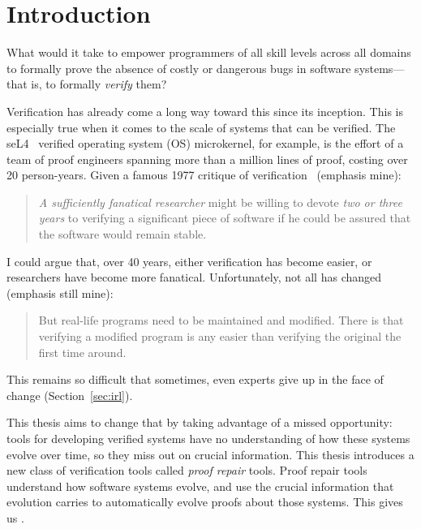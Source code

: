 \chapter{Introduction}



What would it take to empower programmers of all skill levels across all domains to formally prove
the absence of costly or dangerous bugs in software systems---that is, to formally \textit{verify} them?

Verification has already come a long way toward this since its inception.
This is especially true when it comes to the scale of systems that can be verified.
The seL4~\cite{Klein2009} verified operating system (OS) microkernel, for example,
is the effort of a team of proof engineers spanning more than
a million lines of proof, costing over 20 person-years.
Given a famous 1977 critique of verification~\cite{DeMillo1977} (emphasis mine):

\begin{quote}
\textit{A sufficiently fanatical researcher}
might be willing to devote \textit{two or 
three years} to verifying a significant 
piece of software if he could be 
assured that the software would remain stable.
\end{quote}
I could argue that, over 40 years, either verification has become easier,
or researchers have become more fanatical. Unfortunately, not all has changed (emphasis still mine):

\begin{quote}
But real-life programs need to 
be maintained and modified. 
There is  that verifying a modified program is any 
easier than verifying the original the 
first time around.
\end{quote}
This remains so difficult that sometimes, even experts give up in the face of change (Section~\ref{sec:irl}).

This thesis aims to change that by taking advantage of a missed opportunity: tools for developing verified systems
have no understanding of how these systems evolve over time, so they miss out on crucial information.
This thesis introduces a new class of verification tools called \textit{proof repair} tools.
Proof repair tools understand how software systems evolve, and use the crucial information that evolution carries
to automatically evolve proofs about those systems.
This gives us .

